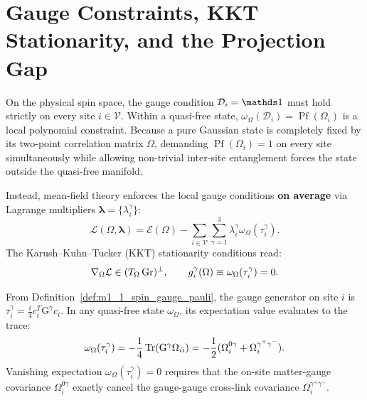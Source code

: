 \section{Gauge Constraints, KKT Stationarity, and the Projection Gap}
\label{sec:m1_1b_gauge_kkt}
On the physical spin space, the gauge condition $\mathcal{D}_i = \Id$ must hold strictly on every site $i \in \mathcal{V}$. Within a quasi-free state, $\omega_\Omega(\mathcal{D}_i) = \operatorname{Pf}(\Omega_i)$ is a local polynomial constraint. Because a pure Gaussian state is completely fixed by its two-point correlation matrix $\Omega$, demanding $\operatorname{Pf}(\Omega_i) = 1$ on every site simultaneously while allowing non-trivial inter-site entanglement forces the state outside the quasi-free manifold.

Instead, mean-field theory enforces the local gauge conditions \textbf{on average} via Lagrange multipliers $\boldsymbol{\lambda} = \{\lambda_i^\gamma\}$:
\begin{equation}
\label{eq:m1_1b_kkt_lagrangian}
\mathcal{L}(\Omega, \boldsymbol{\lambda}) = \mathcal{E}(\Omega) - \sum_{i \in \mathcal{V}} \sum_{\gamma=1}^3 \lambda_i^\gamma \omega_\Omega(\tau_i^\gamma).
\end{equation}
The Karush--Kuhn--Tucker (KKT) stationarity conditions read:
\begin{equation}
\label{eq:m1_1b_kkt_stationarity}
\nabla_\Omega \mathcal{L} \in (T_\Omega \operatorname{Gr})^\perp, \qquad g_i^\gamma(\Omega) \equiv \omega_\Omega(\tau_i^\gamma) = 0.
\end{equation}

\begin{definition}
\label{def:m1_1b_gauge_expectation}
From Definition~\ref{def:m1_1_spin_gauge_pauli}, the gauge generator on site $i$ is $\tau_i^\gamma = \frac{\ii}{4} c_i^T \mathrm{G}^\gamma c_i$. In any quasi-free state $\omega_\Omega$, its expectation value evaluates to the trace:
\begin{equation}
\label{eq:m1_1b_gauge_expectation_trace}
\omega_\Omega(\tau_i^\gamma) = -\frac{1}{4} \operatorname{Tr}(\mathrm{G}^\gamma \Omega_{ii}) = -\frac{1}{2} (\Omega_{i}^{0\gamma} + \Omega_{i}^{\gamma^+ \gamma^-}).
\end{equation}
Vanishing expectation $\omega_\Omega(\tau_i^\gamma) = 0$ requires that the on-site matter-gauge covariance $\Omega_{i}^{0\gamma}$ exactly cancel the gauge-gauge cross-link covariance $\Omega_{i}^{\gamma^+ \gamma^-}$.
\end{definition}

